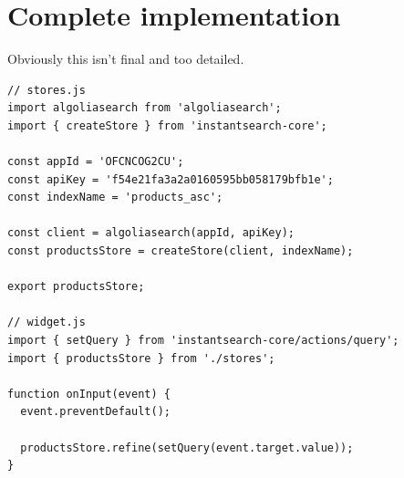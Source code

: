 
\section{Complete implementation} %
\label{sec:complete_implementation}

Obviously this isn't final and too detailed.

\begin{lstlisting}[caption={Using instantearch-core},label={lst:is-core-usage}]
// stores.js
import algoliasearch from 'algoliasearch';
import { createStore } from 'instantsearch-core';

const appId = 'OFCNCOG2CU';
const apiKey = 'f54e21fa3a2a0160595bb058179bfb1e';
const indexName = 'products_asc';

const client = algoliasearch(appId, apiKey);
const productsStore = createStore(client, indexName);

export productsStore;

// widget.js
import { setQuery } from 'instantsearch-core/actions/query';
import { productsStore } from './stores';

function onInput(event) {
  event.preventDefault();

  productsStore.refine(setQuery(event.target.value));
}
\end{lstlisting}


